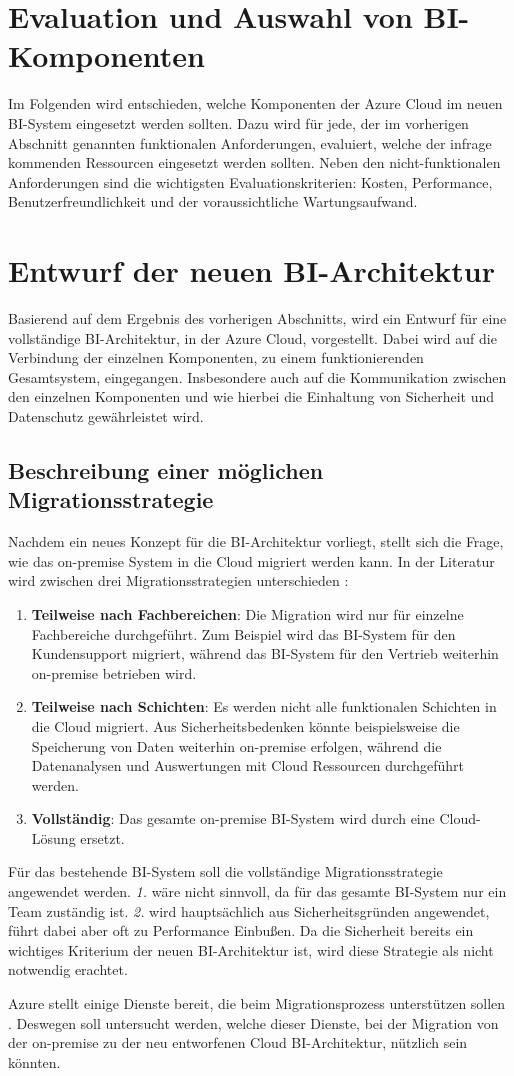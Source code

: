 \section{Evaluation und Auswahl von BI-Komponenten}
\label{sec:evaluationUndAuswahl}
Im Folgenden wird entschieden, welche Komponenten der Azure Cloud im neuen BI-System eingesetzt werden sollten. Dazu wird für jede, der im vorherigen Abschnitt genannten funktionalen Anforderungen, evaluiert, welche der infrage kommenden Ressourcen eingesetzt werden sollten. Neben den nicht-funktionalen Anforderungen sind die wichtigsten Evaluationskriterien: Kosten, Performance, Benutzerfreundlichkeit und der voraussichtliche Wartungsaufwand.

\section{Entwurf der neuen BI-Architektur}
\label{sec:entwurfBIArchitektur}
Basierend auf dem Ergebnis des vorherigen Abschnitts, wird ein Entwurf für eine vollständige BI-Architektur, in der Azure Cloud, vorgestellt. Dabei wird auf die Verbindung der einzelnen Komponenten, zu einem funktionierenden Gesamtsystem, eingegangen. Insbesondere auch auf die Kommunikation zwischen den einzelnen Komponenten und wie hierbei die Einhaltung von Sicherheit und Datenschutz gewährleistet wird.

\subsection{Beschreibung einer möglichen Migrationsstrategie}
\label{sec:entwurfBIArchitektur}
Nachdem ein neues Konzept für die BI-Architektur vorliegt, stellt sich die Frage, wie das on-premise System in die Cloud migriert werden kann. In der Literatur wird zwischen drei Migrationsstrategien unterschieden \cite{juan-verdejo_moving_2014}:
\begin{enumerate}
\item \textbf{Teilweise nach Fachbereichen}: Die Migration wird nur für einzelne Fachbereiche durchgeführt. Zum Beispiel wird das BI-System für den Kundensupport migriert, während das BI-System für den Vertrieb weiterhin on-premise betrieben wird.
\item \textbf{Teilweise nach Schichten}: Es werden nicht alle funktionalen Schichten in die Cloud migriert. Aus Sicherheitsbedenken könnte beispielsweise die Speicherung von Daten weiterhin on-premise erfolgen, während die Datenanalysen und Auswertungen mit Cloud Ressourcen durchgeführt werden.
\item \textbf{Vollständig}: Das gesamte on-premise BI-System wird durch eine Cloud-Lösung ersetzt.
\end{enumerate}
Für das bestehende BI-System soll die vollständige Migrationsstrategie angewendet werden. \textit{1.} wäre nicht sinnvoll, da für das gesamte BI-System nur ein Team zuständig ist. \textit{2.} wird hauptsächlich aus Sicherheitsgründen angewendet, führt dabei aber oft zu Performance Einbußen. Da die Sicherheit bereits ein wichtiges Kriterium der neuen BI-Architektur ist, wird diese Strategie als nicht notwendig erachtet.

Azure stellt einige Dienste bereit, die beim Migrationsprozess unterstützen sollen \cite{chilberto_building_2020}. Deswegen soll untersucht werden, welche dieser Dienste, bei der Migration von der on-premise zu der neu entworfenen Cloud BI-Architektur, nützlich sein könnten.
